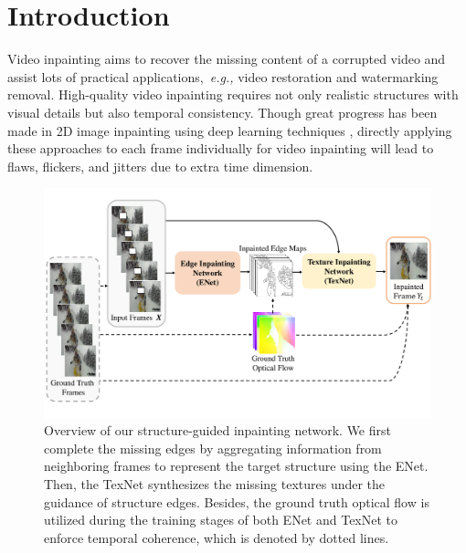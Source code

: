 

\section{Introduction}


Video inpainting aims to recover the missing content of a corrupted video and assist lots of practical applications,~\emph{e.g.,} video restoration and watermarking removal. 
High-quality video inpainting requires not only realistic structures with visual details but also temporal consistency. 
% 
Though great progress has been made in 2D image inpainting using deep learning techniques \cite{yu2018free,Xiong_2019_CVPR}, directly applying these approaches to each frame individually for video inpainting will lead to flaws, flickers, and jitters due to extra time dimension. 

\begin{figure}[t]
	\centering
	\includegraphics[width=1.01\columnwidth]{zong} %
	\caption{Overview of our structure-guided inpainting network. We first complete the missing edges by aggregating information from neighboring frames to represent the target structure using the ENet. Then, the TexNet synthesizes the missing textures under the guidance of structure edges. Besides, the ground truth optical flow is utilized during the training stages of both ENet and TexNet to enforce temporal coherence, which is denoted by dotted lines.}
	\label{zong}
\end{figure}




